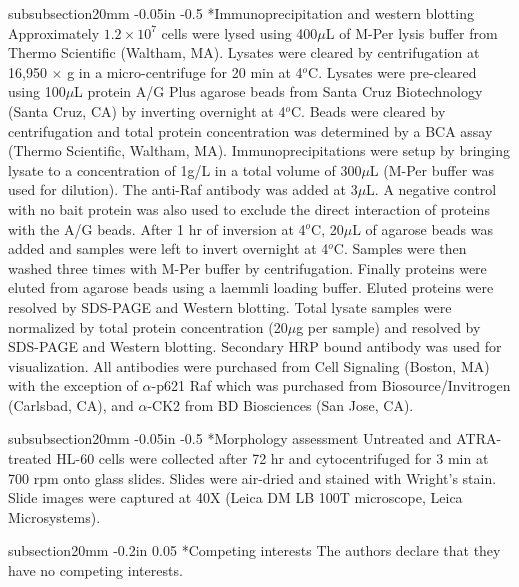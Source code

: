\documentclass[12pt]{article}
\makeatletter
\renewcommand\subsubsection{\@startsection
	{subsubsection}{2}{0mm}
	{-0.05in}
	{-0.5\baselineskip}
	{\normalfont\normalsize\itshape}}
\renewcommand\section{\@startsection
	{subsection}{2}{0mm}
	{-0.2in}
	{0.05\baselineskip}
	{\normalfont\large\bfseries}}
\makeatother
\begin{document}
\subsubsection*{Immunoprecipitation and western blotting}
Approximately $1.2 \times 10^7$ cells were lysed using 400$\mu$L of M-Per lysis buffer from Thermo Scientific (Waltham, MA).
Lysates were cleared by centrifugation at 16,950 $\times$ g in a micro-centrifuge for 20 min at 4$^{o}$C.
Lysates were pre-cleared using 100$\mu$L protein A/G Plus agarose beads from Santa Cruz Biotechnology (Santa Cruz, CA) by
inverting overnight at 4$^{o}$C.  Beads were cleared by centrifugation and total protein concentration
was determined by a BCA assay (Thermo Scientific, Waltham, MA).  Immunoprecipitations were setup by bringing
lysate to a concentration of 1g/L in a total volume of 300$\mu$L (M-Per buffer was used for dilution).
The anti-Raf antibody was added at 3$\mu$L.
A negative control with no bait protein was also used to exclude the direct interaction of proteins with the A/G beads.
After 1 hr of inversion at 4$^{o}$C, 20$\mu$L of agarose beads was added and samples were left
to invert overnight at 4$^{o}$C. Samples were then washed three times with M-Per buffer by centrifugation.
Finally proteins were eluted from agarose beads using a laemmli loading buffer.
Eluted proteins were resolved by SDS-PAGE and Western blotting.  Total
lysate samples were normalized by total protein concentration (20$\mu$g per sample)
and resolved by SDS-PAGE and Western blotting.  Secondary HRP bound antibody was used for visualization.
All antibodies were purchased from Cell Signaling (Boston, MA) with the exception of $\alpha$-p621 Raf which was purchased from Biosource/Invitrogen (Carlsbad, CA),
and $\alpha$-CK2 from BD Biosciences (San Jose, CA).

\subsubsection*{Morphology assessment}
Untreated and ATRA-treated HL-60 cells were collected after 72 hr and cytocentrifuged for 3 min at 700 rpm onto glass slides.
Slides were air-dried and stained with Wright’s stain. Slide images were captured at 40X (Leica DM LB 100T microscope, Leica Microsystems).

\clearpage

\section*{Competing interests}
The authors declare that they have no competing interests.
\end{document}
